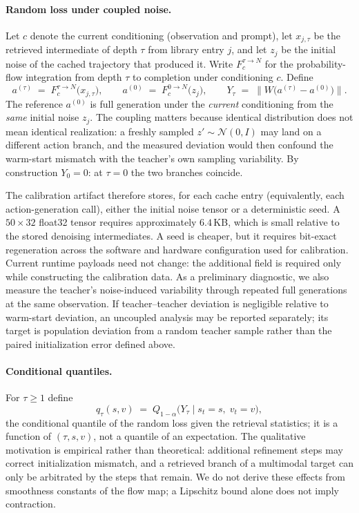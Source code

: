 \documentclass{article}
\begin{document}
\paragraph{Random loss under coupled noise.}
Let $c$ denote the current conditioning (observation and prompt), let
$x_{j,\tau}$ be the retrieved intermediate of depth $\tau$ from library entry
$j$, and let $z_j$ be the initial noise of the cached trajectory that
produced it. Write $F_{c}^{\tau \to N}$ for the probability-flow integration
from depth $\tau$ to completion under conditioning $c$. Define
\begin{equation}
a^{(\tau)} \;=\; F_{c}^{\tau \to N}\bigl( x_{j,\tau} \bigr),
\qquad
a^{(0)} \;=\; F_{c}^{0 \to N}\bigl( z_j \bigr),
\qquad
Y_\tau \;=\; \bigl\| W\bigl(a^{(\tau)} - a^{(0)}\bigr) \bigr\| .
\label{eq:Y}
\end{equation}
The reference $a^{(0)}$ is full generation under the \emph{current}
conditioning from the \emph{same} initial noise $z_j$. The coupling matters
because identical distribution does not mean identical realization: a freshly
sampled $z' \sim \mathcal{N}(0, I)$ may land on a different action branch, and
the measured deviation would then confound the warm-start mismatch with the
teacher's own sampling variability. By construction $Y_0 = 0$: at
$\tau = 0$ the two branches coincide.

The calibration artifact therefore stores, for each cache entry (equivalently,
each action-generation call), either the initial noise tensor or a
deterministic seed. A $50 \times 32$ float32 tensor requires approximately
$6.4$\,KB, which is small relative to the stored denoising intermediates. A
seed is cheaper, but it requires bit-exact regeneration across the software
and hardware configuration used for calibration. Current runtime payloads
need not change: the additional field is required only while constructing the
calibration data. As a preliminary diagnostic, we also measure the teacher's
noise-induced variability through repeated full generations at the same
observation. If teacher--teacher deviation is negligible relative to
warm-start deviation, an uncoupled analysis may be reported separately; its
target is population deviation from a random teacher sample rather than the
paired initialization error defined above.

\paragraph{Conditional quantiles.}
For $\tau \ge 1$ define
\begin{equation}
q_\tau(s, v) \;=\; Q_{1-\alpha}\bigl( Y_\tau \mid s_t = s,\; v_t = v \bigr),
\label{eq:q}
\end{equation}
the conditional quantile of the random loss given the retrieval statistics;
it is a function of $(\tau, s, v)$, not a quantile of an expectation. The
qualitative motivation is empirical rather than theoretical: additional
refinement steps may correct initialization mismatch, and a retrieved branch
of a multimodal target can only be arbitrated by the steps that remain. We
do not derive these effects from smoothness constants of the flow map; a
Lipschitz bound alone does not imply contraction.
\end{document}
